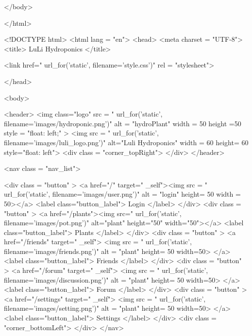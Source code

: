 \documentclass[12pt]{article} %
\begin{document}
\begin{htmlcode}[caption={Login Page HTML}]
       
    
    </body>
    
    
    
    </html>
    
    \end{htmlcode}
    
    \pagebreak
    
    \begin{htmlcode}[caption={Plant Page HTML}]
    <!DOCTYPE html>
    <html lang = "en">
    <head>
    <meta charset = "UTF-8">
    <title> LuLi Hydroponics </title>
    
    <link href="{{ url_for('static', filename='style.css')}}" 
          rel = "stylesheet">
    
    
    </head>
    
    <body>
     
       <header>
          <img class="logo" src = "{{ url_for('static', filename='images/hydroponic.png')}}" alt = "hydroPlant"  width = 50 height =50 style = "float: left;" >   
          <img src = "{{ url_for('static', filename='images/luli_logo.png')}}" alt="Luli Hydroponics" width = 60 height= 60 style="float: left">
          <div class = "corner_topRight"> </div>
       </header>
    
       <nav class = "nav_list">
          
          <div class = "button" > 
             <a href="/" target=" _self"><img src = "{{ url_for('static', filename='images/user.png')}}" alt = "login" height= 50 width = 50></a>
             <label class="button_label"> Login </label> 
          </div>
          <div class = "button" > 
             <a href="/plants"><img src="{{ url_for('static', filename='images/pot.png')}}" alt="plant" height="50" width="50"></a>
             <label class="button_label"> Plants </label> 
          </div>
          <div class = "button" > 
             <a href="/friends" target=" _self"> <img src = "{{ url_for('static', filename='images/friends.png')}}" alt = "plant" height= 50 width=50> </a>
             <label class="button_label"> Friends </label> 
          </div>
          <div class = "button" > 
             <a href="/forum" target=" _self"> <img src = "{{ url_for('static', filename='images/discussion.png')}}" alt = "plant" height= 50 width=50> </a>
             <label class="button_label"> Forum </label> 
          </div>
          <div class = "button" > 
             <a href="/settings" target=" _self"> <img src = "{{ url_for('static', filename='images/setting.png')}}" alt = "plant" height= 50 width=50> </a>
             <label class="button_label"> Settings </label> 
          </div>
             <div class = "corner_bottomLeft"> </div>
         </nav>
         

\end{htmlcode}
\end{document}
